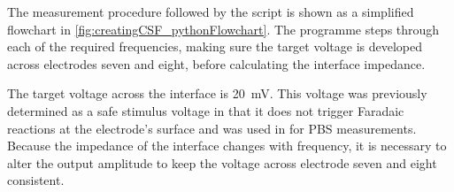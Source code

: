   The measurement procedure followed by the script is shown as a simplified flowchart in \cref{fig:creatingCSF_pythonFlowchart}.
  The programme steps through each of the required frequencies, making sure the target voltage is developed across electrodes seven and eight, before calculating the interface impedance.

  The target voltage across the interface is \SI{20}{\milli\volt}.
  This voltage was previously determined as a safe stimulus voltage in that it does not trigger Faradaic reactions at the electrode's surface and was used in for PBS measurements.
  Because the impedance of the interface changes with frequency, it is necessary to alter the output amplitude to keep the voltage across electrode seven and eight consistent.









